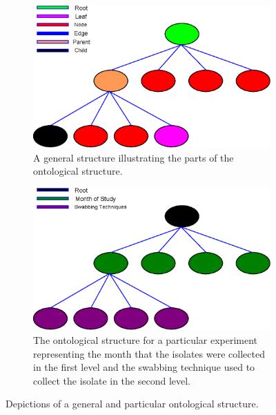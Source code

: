 \documentclass[12pt]{ucthesis}
\begin{document}
      \begin{figure}[t]
         \centering
         \begin{subfigure}[t]{0.45\textwidth}
            \centering
            \includegraphics[width=\textwidth]{graphics/IsolateTree.eps}
            \caption{A general structure illustrating the parts of the ontological
                     structure.}
            \label{fig:general_structure}
         \end{subfigure}
         \hfill
         \begin{subfigure}[t]{0.45\textwidth}
            \centering
            \includegraphics[width=\textwidth]{graphics/IsolateTree_CurrentStudy.eps}
            \caption{The ontological structure for a particular experiment
                     representing the month that the isolates were collected in
                     the first level and the swabbing technique used to collect the
                     isolate in the second level.}
            \label{fig:cluster_structure}
         \end{subfigure}
         \caption{Depictions of a general and particular ontological structure.}
         \label{fig:ontology_structure}
      \end{figure}
      
\end{document}
